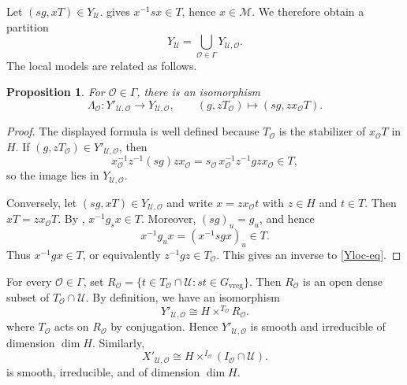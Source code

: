 \documentclass[11pt,letterpaper]{amsart}
\newtheorem{proposition}[theorem]{Proposition}
\theoremstyle{definition}
\numberwithin{equation}{section}
\numberwithin{theorem}{section}
\begin{document}
Let \((sg,xT)\in Y_{\mathcal U}\).  gives
\(x^{-1}sx\in T\), hence \(x\in\mathcal M\). We therefore obtain a
partition
\[
Y_{\mathcal U}
 =\bigcup_{{\mathcal O}\in\Gamma}
   Y_{\mathcal U,{\mathcal O}}.
\]
The local models are related as follows.
\begin{proposition}\label{Yloc}
For \(\mathcal O\in\Gamma\), there is an isomorphism
\begin{equation}\label{Yloc-eq}
\Lambda_{\mathcal O}:
Y'_{\mathcal U,\mathcal O}\longrightarrow
Y_{\mathcal U,\mathcal O},
\qquad
(g,zT_{\mathcal O})\longmapsto
(sg,zx_{\mathcal O}T).                              
\end{equation}
\end{proposition}
\begin{proof}
The displayed formula is well defined because $T_{\mathcal O}$ is the
stabilizer of $x_{\mathcal O}T$ in $H$. If
$(g,zT_{\mathcal O})\in Y'_{\mathcal U,\mathcal O}$, then
\[
 x_{\mathcal O}^{-1}z^{-1}(sg)zx_{\mathcal O}
 =s_{\mathcal O}\,x_{\mathcal O}^{-1}z^{-1}gzx_{\mathcal O}\in T,
\]
so the image lies in $Y_{\mathcal U,\mathcal O}$.

Conversely, let $(sg,xT)\in Y_{\mathcal U,\mathcal O}$ and write
$x=zx_{\mathcal O}t$ with $z\in H$ and $t\in T$. Then
$xT=zx_{\mathcal O}T$. By ,
$x^{-1}g_sx\in T$. Moreover, $(sg)_u=g_u$, and hence
\[
 x^{-1}g_ux=(x^{-1}sgx)_u\in T.
\]
Thus $x^{-1}gx\in T$, or equivalently
$z^{-1}gz\in T_{\mathcal O}$. This gives an inverse to
\eqref{Yloc-eq}.
\end{proof}


For every \(\mathcal O\in\Gamma\), set
\(
R_{\mathcal O}
 =\{t\in T_{\mathcal O}\cap\mathcal U:st\in G_{\mathrm{vreg}}\}.   
\)
Then \(R_{\mathcal O}\) is an open dense subset of
\(T_{\mathcal O}\cap\mathcal U\).
By definition, we have an isomorphism
\begin{equation*}
Y'_{\mathcal U,\mathcal O}
 \cong H\times^{T_{\mathcal O}}R_{\mathcal O}.
\end{equation*}
where \(T_{\mathcal O}\) acts on $R_{\mathcal O}$ by conjugation. Hence
$Y'_{\mathcal U,\mathcal O}$ is smooth and irreducible of dimension
$\dim H$. Similarly,
\[
X'_{\mathcal U,\mathcal O}
 \cong H\times^{I_{\mathcal O}}
       (I_{\mathcal O}\cap\mathcal U).
\]
is smooth, irreducible, and of dimension \(\dim H\).
\end{document}
